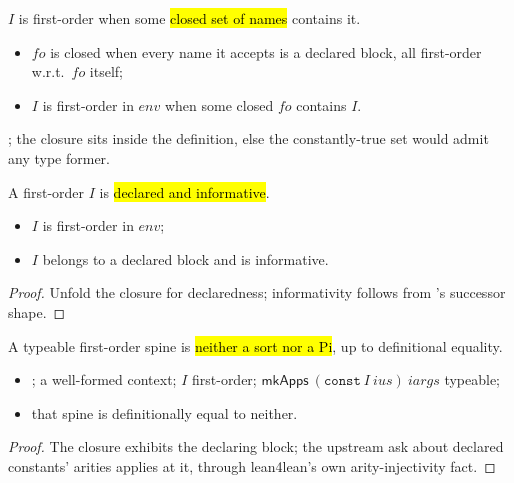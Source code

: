 \begin{definition}
\label{def:FirstOrderInd}
\leanok
{}
 $I$ is first-order when some \hl{closed set of names} contains it.
\begin{itemize}
\item $fo$ is closed when every name it accepts is a declared block, all first-order w.r.t.\ $fo$ itself;
\item $I$ is first-order in $env$ when some closed $fo$ contains $I$.
\end{itemize}
 ; the closure sits inside the definition, else the constantly-true set
would admit any type former.
\end{definition}

\begin{lemma}
\label{lem:FirstOrderInd-indDeclOf}
\leanok
{}
 A first-order $I$ is \hl{declared and informative}.
\begin{itemize}
\item {} $I$ is first-order in $env$;
\item {} $I$ belongs to a declared block and is informative.
\end{itemize}
\end{lemma}
\begin{proof}
\leanok
{}
 Unfold the closure for declaredness; informativity follows from 's
successor shape.
\end{proof}

\begin{lemma}
\label{lem:FirstOrderInd-notSortNotPi}
\leanok
{}
 A typeable first-order spine is \hl{neither a sort nor a Pi}, up to definitional
equality.
\begin{itemize}
\item {} ; a well-formed context; $I$ first-order;
$\mathsf{mkApps}\ (\mathtt{const}\ I\ ius)\ iargs$ typeable;
\item {} that spine is definitionally equal to neither.
\end{itemize}
\end{lemma}
\begin{proof}
\leanok
{}
 The closure exhibits the declaring block; the upstream ask about declared constants'
arities applies at it, through lean4lean's own arity-injectivity fact.
\end{proof}

